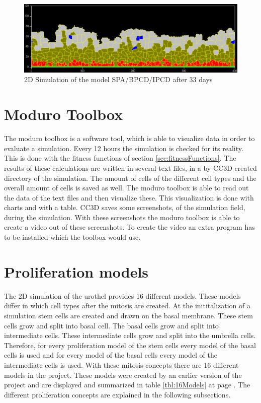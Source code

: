 \begin{figure}[ht]
	\center
	\includegraphics[scale=0.35]{figures/2DSimulation-33Days.png}
	\caption{2D Simulation of the model SPA/BPCD/IPCD after 33 days}
	\label{img:2DSimulation33Days}
\end{figure}

\section{Moduro Toolbox}
The moduro toolbox is a software tool, which is able to visualize data in order to evaluate a simulation. \newline
Every 12 hours the simulation is checked for its reality. This is done with the fitness functions of section \ref{sec:fitnessFunctions}. The results of these calculations are written in several text files, in a by \ac{CC3D} created directory of the simulation. The amount of cells of the different cell types and the overall amount of cells is saved as well. The moduro toolbox is able to read out the data of the text files and then visualize these. This visualization is done with charts and with a table. \newline
\ac{CC3D} saves some screenshots, of the simulation field, during the simulation. With these screenshots the moduro toolbox is able to create a video out of these screenshots. To create the video an extra program has to be installed which the toolbox would use.

\section{Proliferation models}\label{sec:Models}
The 2D simulation of the urothel provides 16 different models. These models differ in which cell types after the mitosis are created. \newline 
At the inititalization of a simulation stem cells are created and drawn on the basal membrane. These stem cells grow and split into basal cell. The basal cells grow and split into intermediate cells. These intermediate cells grow and split into the umbrella cells. Therefore, for every proliferation model of the stem cells every model of the basal cells is used and for every model of the basal cells every model of the intermediate cells is used. \newline
With these mitosis concepts there are 16 different models in the project. These models were created by an earlier version of the project \cite{Torelli2017} and are displayed and summarized in table \ref{tbl:16Models} at page \pageref{tbl:16Models}. The different proliferation concepts are explained in the following subsections.
